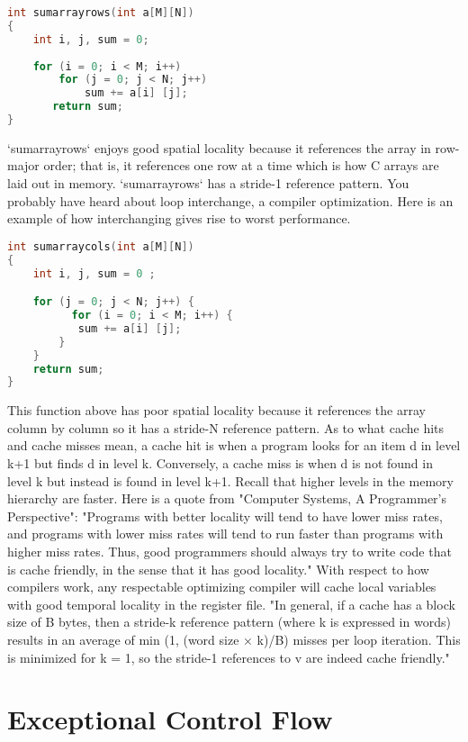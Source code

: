 \documentclass{amsbook}
\begin{document}
\begin{lstlisting}[language=C]
int sumarrayrows(int a[M][N])
{
	int i, j, sum = 0;
	
	for (i = 0; i < M; i++)
		for (j = 0; j < N; j++)
			sum += a[i] [j];
       return sum;
}
\end{lstlisting}
`sumarrayrows` enjoys good spatial locality because it references the array in row-major order; that is, it references one row at a time which is how C arrays are laid out in memory. `sumarrayrows` has a stride-1 reference pattern. You probably have heard about loop interchange, a compiler optimization. Here is an example of how interchanging gives rise to worst performance.

\begin{lstlisting}[language=C]
int sumarraycols(int a[M][N])
{
	int i, j, sum = 0 ;

	for (j = 0; j < N; j++) {
          for (i = 0; i < M; i++) {
	       sum += a[i] [j];
        }
    }
    return sum;
}  
\end{lstlisting}
This function above has poor spatial locality because it references the array column by column so it has a stride-N reference pattern. As to what cache hits and cache misses mean, a cache hit is when a program looks for an item d in level k+1 but finds d in level k. Conversely, a cache miss is when d is not found in level k but instead is found in level k+1. Recall that higher levels in the memory hierarchy are faster. Here is a quote from "Computer Systems, A Programmer's Perspective": "Programs with better locality will tend to have lower miss rates, and programs with lower miss rates will tend to run faster than programs with higher miss rates. Thus, good programmers should always try to write code that is cache friendly, in the sense that it has good locality." With respect to how compilers work, any respectable optimizing compiler will cache local variables with good temporal locality in the register file. "In general, if a cache has a block size of B bytes, then a stride-k reference pattern (where k is expressed in words) results in an average of min (1, (word size × k)/B) misses per loop iteration. This is minimized for k = 1, so the stride-1 references to v are indeed cache friendly."

\section{Exceptional Control Flow}
\end{document}
